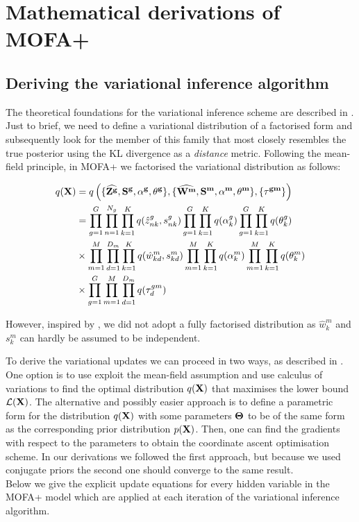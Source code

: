 \chapter{Mathematical derivations of MOFA+} \label{appendix:mofa}

\section{Deriving the variational inference algorithm}

The theoretical foundations for the variational inference scheme are described in . Just to brief, we need to define a variational distribution of a factorised form and subsequently look for the member of this family that most closely resembles the true posterior using the KL divergence as a \textit{distance} metric. Following the mean-field principle, in MOFA+ we factorised the variational distribution as follows:

\begin{equation} \begin{aligned}
	q({\bf X}) &= q \left(\{\widehat{{\bf Z}^{\bf g}}, {\bf S}^{\bf g}, \bf{\alpha^g}, \bf{\theta^g}\}, \{\widehat{{\bf W}^m}, {\bf S}^m, \bf\alpha^m, \bf\theta^m\}, \{ \bf\tau^{gm}\} \right)\\
	&= \prod_{g=1}^{G} \prod_{n=1}^{N_g} \prod_{k=1}^{K} q(\hat{z}_{nk}^g, s_{nk}^g) \prod_{g=1}^{G} \prod_{k=1}^{K} q(\alpha_k^g) \prod_{g=1}^{G} \prod_{k=1}^{K} q(\theta_k^g) \\
	&\times \prod_{m=1}^{M} \prod_{d=1}^{D_m} \prod_{k=1}^{K} q(\hat{w}_{kd}^m,s_{kd}^m) \prod_{m=1}^{M} \prod_{k=1}^{K} q(\alpha_k^m) \prod_{m=1}^{M} \prod_{k=1}^{K} q(\theta_k^m)  \\
	&\times \prod_{g=1}^{G} \prod_{m=1}^{M} \prod_{d=1}^{D_m} q(\tau_d^{gm})
\end{aligned} \end{equation}

However, inspired by \cite{Titsias2011}, we did not adopt a fully factorised distribution as $\hat{w}_k^m$ and $s_k^m$ can hardly be assumed to be independent.

To derive the variational updates we can proceed in two ways, as described in . One option is to use exploit the  mean-field assumption and use calculus of variations to find the optimal distribution $q({\bf X})$ that maximises the lower bound $\mathcal{L}({\bf X})$\cite{Bishop2006,Murphy}. The alternative and possibly easier approach is to define a parametric form for the distribution $q({\bf X})$ with some parameters $\mbox{\boldmath $\Theta$}$ to be of the same form as the corresponding prior distribution $p({\bf X})$. Then, one can find the gradients with respect to the parameters to obtain the coordinate ascent optimisation scheme. In our derivations we followed the first approach, but because we used conjugate priors the second one should converge to the same result.\\
Below we give the explicit update equations for every hidden variable in the MOFA+ model which are applied at each iteration of the variational inference algorithm.

